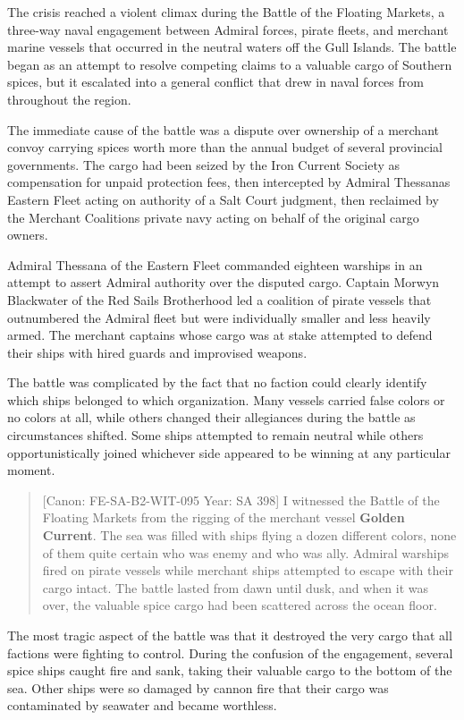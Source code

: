 The crisis reached a violent climax during the Battle of the Floating
Markets, a three-way naval engagement between Admiral forces, pirate
fleets, and merchant marine vessels that occurred in the neutral waters
off the Gull Islands. The battle began as an attempt to resolve
competing claims to a valuable cargo of Southern spices, but it
escalated into a general conflict that drew in naval forces from
throughout the region.

The immediate cause of the battle was a dispute over ownership of a
merchant convoy carrying spices worth more than the annual budget of
several provincial governments. The cargo had been seized by the Iron
Current Society as compensation for unpaid protection fees, then
intercepted by Admiral Thessana\textquotesingle s Eastern Fleet acting
on authority of a Salt Court judgment, then reclaimed by the Merchant
Coalition\textquotesingle s private navy acting on behalf of the
original cargo owners.

Admiral Thessana of the Eastern Fleet commanded eighteen warships in an
attempt to assert Admiral authority over the disputed cargo. Captain
Morwyn Blackwater of the Red Sails Brotherhood led a coalition of pirate
vessels that outnumbered the Admiral fleet but were individually smaller
and less heavily armed. The merchant captains whose cargo was at stake
attempted to defend their ships with hired guards and improvised
weapons.

The battle was complicated by the fact that no faction could clearly
identify which ships belonged to which organization. Many vessels
carried false colors or no colors at all, while others changed their
allegiances during the battle as circumstances shifted. Some ships
attempted to remain neutral while others opportunistically joined
whichever side appeared to be winning at any particular moment.

\begin{quote}
{[}Canon: FE-SA-B2-WIT-095 \textbar{} Year: SA 398{]} I witnessed the
Battle of the Floating Markets from the rigging of the merchant vessel
\textbf{Golden Current}. The sea was filled with ships flying a dozen
different colors, none of them quite certain who was enemy and who was
ally. Admiral warships fired on pirate vessels while merchant ships
attempted to escape with their cargo intact. The battle lasted from dawn
until dusk, and when it was over, the valuable spice cargo had been
scattered across the ocean floor.
\end{quote}

The most tragic aspect of the battle was that it destroyed the very
cargo that all factions were fighting to control. During the confusion
of the engagement, several spice ships caught fire and sank, taking
their valuable cargo to the bottom of the sea. Other ships were so
damaged by cannon fire that their cargo was contaminated by seawater and
became worthless.


